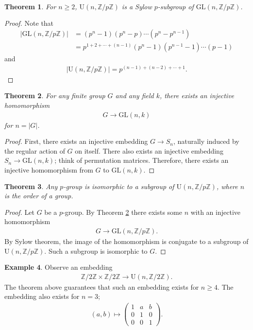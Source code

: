 \documentclass[12pt]{report}
\theoremstyle{plain}
\newtheorem{theorem}{Theorem}[section]
\theoremstyle{remark}
\theoremstyle{definition}
\newtheorem{example}[theorem]{Example}
\newcommand{\Z}{\mathbb{Z}}
\begin{document}
\begin{theorem}
    For $n\ge 2$, $\mathrm{U}(n,\Z/p\Z)$ is a Sylow $p$-subgroup of $\mathrm{GL}(n,\Z/p\Z)$.
\end{theorem}
\begin{proof}
    Note that
    \begin{align*}
        |\mathrm{GL}(n,\Z/p\Z)| &= (p^n-1)(p^n-p)\cdots(p^n-p^{n-1}) \\
        &= p^{1+2+\cdots+(n-1)}(p^n-1)(p^{n-1}-1)\cdots(p-1)
    \end{align*}
    and
    \begin{align*}
        |\mathrm{U}(n,\Z/p\Z)| = p^{(n-1)+(n-2)+\cdots+1}.
    \end{align*}
\end{proof}

\begin{theorem}\label{Theorem 1.11.3.}
    For any finite group $G$ and any field $k$, there exists an injective homomorphism
    \begin{align*}
        G\rightarrow \mathrm{GL}(n,k)
    \end{align*}
    for $n=|G|$.
\end{theorem}
\begin{proof}
    First, there exists an injective embedding $G\rightarrow S_n$, naturally induced by the regular action of $G$ on itself. There also exists an injective embedding $S_n\rightarrow \mathrm{GL}(n,k)$; think of permutation matrices. Therefore, there exists an injective homomorphism from $G$ to $\mathrm{GL}(n,k)$.
\end{proof}

\begin{theorem}
    Any $p$-group is isomorphic to a subgroup of $\mathrm{U}(n,\Z/p\Z)$, where $n$ is the order of a group.
\end{theorem}
\begin{proof}
    Let $G$ be a $p$-group. By Theorem \ref{Theorem 1.11.3.} there exists some $n$ with an injective homomorphism
    \begin{align*}
        G\rightarrow\mathrm{GL}(n,\Z/p\Z).
    \end{align*}
    By Sylow theorem, the image of the homomorphism is conjugate to a subgroup of $\mathrm{U}(n,\Z/p\Z)$. Such a subgroup is isomorphic to $G$.
\end{proof}

\begin{example}
    Observe an embedding
    \begin{align*}
        \Z/2\Z \times \Z/2\Z \rightarrow \mathrm{U}(n,\Z/2\Z).
    \end{align*}
    The theorem above guarantees that such an embedding exists for $n\ge 4$. The embedding also exists for $n=3$;
    \begin{align*}
        (a,b)\mapsto \begin{pmatrix}
            1 & a & b \\ 0 & 1 & 0 \\ 0 & 0 & 1
        \end{pmatrix}.
    \end{align*}
\end{example}
\end{document}
